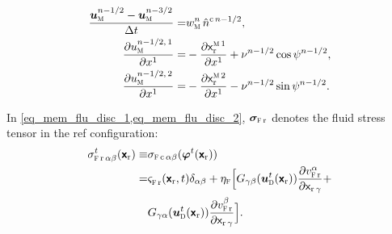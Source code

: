\begin{align}
    \label{eq_mem_flu_disc_4}
    \frac {\bumem^\nmhalf-\bumem^\nmthreehalf}{\deltat}                                                                                 = & \wmem^{n} \, \normalc{\nmhalf}, \\
    \label{eq_mem_flu_disc_5}
    \pder {\umem^{\nmhalf, \, 1}}{x^1}                                                                                            =       &
    - \pder{\xmemr{1}}{\xcoord^1} + \nu^\nmhalf \cos \psi^\nmhalf,                                                                                                          \\
    \label{eq_mem_flu_disc_6}
    \pder {\umem^{\nmhalf, \, 2}}{x^1}                                                                                               =    & - \pder{\xmemr{2}}{\xcoord^1}
    -\nu^\nmhalf \sin \psi^\nmhalf.
\end{align}

In \cref{eq_mem_flu_disc_1,eq_mem_flu_disc_2}, $\bsigmastressr$ denotes the fluid stress tensor in the \ac{ref} configuration:
\begin{align}
    \label{eq_def_sigma_ref}
    \sigmastressr{\alpha}{\beta}^t(\bxr)  \equiv & \sigmastressc{\alpha}{\beta}({\bm \varphi}^t(\bxr)) \newlinenn
    =                                            & \sigmafr{}(\bxr, t) \delta_{\alpha \beta} + \etaf \Big[ G_{\gamma \beta}(\budom^t(\bxr)) \pderr{\vfr{\alpha}}{\gamma} + \newlinenn
                                                 & G_{\gamma \alpha}(\budom^t(\bxr)) \pderr{\vfr{\beta}}{\gamma}\Big].
\end{align}



